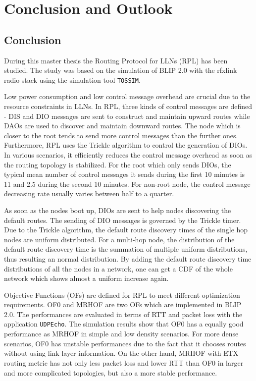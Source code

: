 \chapter{Conclusion and Outlook}
\label{Con}
\section{Conclusion}
\label{Con:Con}

During this master thesis the Routing Protocol for LLNs (RPL) has been studied. The study was based on the simulation of BLIP 2.0 with the rfxlink radio stack using the simulation tool \texttt{TOSSIM}.

Low power consumption and low control message overhead are crucial due to the resource constraints in LLNs. In RPL, three kinds of control messages are defined - DIS and DIO messages are sent to construct and maintain upward routes while DAOs are used to discover and maintain downward routes. The node which is closer to the root tends to send more control messages than the further ones. Furthermore, RPL uses the Trickle algorithm to control the generation of DIOs. In various scenarios, it efficiently reduces the control message overhead as soon as the routing topology is stabilized. For the root which only sends DIOs, the typical mean number of control messages it sends during the first 10 minutes is 11 and 2.5 during the second 10 minutes. For non-root node, the control message decreasing rate usually varies between half to a quarter.

As soon as the nodes boot up, DIOs are sent to help nodes discovering the default routes. The sending of DIO messages is governed by the Trickle timer. Due to the Trickle algorithm, the default route discovery times of the single hop nodes are uniform distributed. For a multi-hop node, the distribution of the default route discovery time is the summation of multiple uniform distributions, thus resulting an normal distribution. By adding the default route discovery time distributions of all the nodes in a network, one can get a CDF of the whole network which shows almost a uniform increase again.

Objective Functions (OFs) are defined for RPL to meet different optimization requirements. OF0 and MRHOF are two OFs which are implemented in BLIP 2.0. The performances are evaluated in terms of RTT and packet loss with the application \texttt{UDPEcho}. The simulation results show that OF0 has a equally good performance as MRHOF in simple and low density scenarios. For more dense scenarios, OF0 has unstable performances due to the fact that it chooses routes without using link layer information. On the other hand, MRHOF with ETX routing metric has not only less packet loss and lower RTT than OF0 in larger and more complicated topologies, but also a more stable performance.

